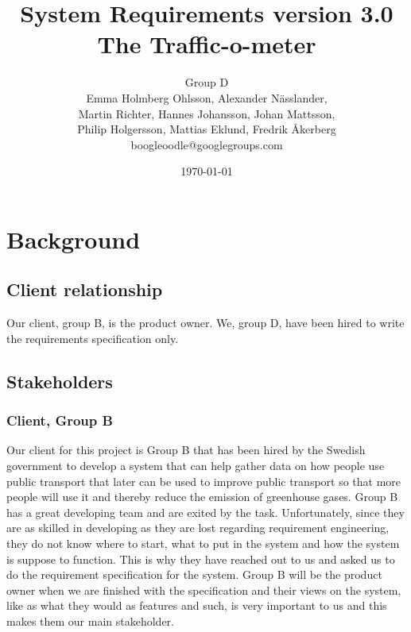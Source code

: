 \documentclass[a4paper]{article}
\title{System Requirements version 3.0\\ The Traffic-o-meter}
\author{Group D\\ Emma Holmberg Ohlsson, Alexander Nässlander,\\Martin Richter, Hannes Johansson, Johan Mattsson,\\Philip Holgersson, Mattias Eklund, Fredrik Åkerberg\\boogleoodle@googlegroups.com}
\date{\today}
\begin{document}
	\maketitle
	\thispagestyle{empty}
	\setcounter{page}{0}
	\pagebreak
	\tableofcontents
	\thispagestyle{empty}
	\pagebreak
	



	\section{Background} %
	\label{sec:background}
	
		\subsection{Client relationship}
	Our client, group B, is the product owner. We, group D, have been hired to write the requirements specification only.
		\subsection{Stakeholders} %
		\label{sub:stakeholders}
			\subsubsection{Client, Group B}
			Our client for this project is Group B that has been hired by the Swedish government to develop a system that can help gather data on how people use public transport that later can be used to improve public transport so that more people will use it and thereby reduce the emission of greenhouse gases. Group B has a great developing team and are exited by the task. Unfortunately, since they are as skilled in developing as they are lost regarding requirement engineering, they do not know where to start, what to put in the system and how the system is suppose to function. This is why they have reached out to us and asked us to do the requirement specification for the system. Group B will be the product owner when we are finished with the specification and their views on the system, like as what they would as features and such, is very important to us and this makes them our main stakeholder.
\end{document}
